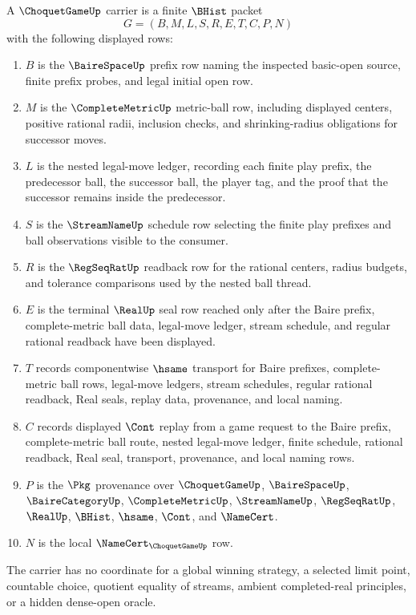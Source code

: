 \begin{definition}
\label{def:choquet-game-carrier}
A $\ChoquetGameUp$ carrier is a finite $\BHist$ packet
$$
G=(B,M,L,S,R,E,T,C,P,N)
$$
with the following displayed rows:
\begin{enumerate}
\item $B$ is the $\BaireSpaceUp$ prefix row naming the inspected basic-open source, finite prefix probes, and legal initial open row.
\item $M$ is the $\CompleteMetricUp$ metric-ball row, including displayed centers, positive rational radii, inclusion checks, and shrinking-radius obligations for successor moves.
\item $L$ is the nested legal-move ledger, recording each finite play prefix, the predecessor ball, the successor ball, the player tag, and the proof that the successor remains inside the predecessor.
\item $S$ is the $\StreamNameUp$ schedule row selecting the finite play prefixes and ball observations visible to the consumer.
\item $R$ is the $\RegSeqRatUp$ readback row for the rational centers, radius budgets, and tolerance comparisons used by the nested ball thread.
\item $E$ is the terminal $\RealUp$ seal row reached only after the Baire prefix, complete-metric ball data, legal-move ledger, stream schedule, and regular rational readback have been displayed.
\item $T$ records componentwise $\hsame$ transport for Baire prefixes, complete-metric ball rows, legal-move ledgers, stream schedules, regular rational readback, Real seals, replay data, provenance, and local naming.
\item $C$ records displayed $\Cont$ replay from a game request to the Baire prefix, complete-metric ball route, nested legal-move ledger, finite schedule, rational readback, Real seal, transport, provenance, and local naming rows.
\item $P$ is the $\Pkg$ provenance over $\ChoquetGameUp$, $\BaireSpaceUp$, $\BaireCategoryUp$, $\CompleteMetricUp$, $\StreamNameUp$, $\RegSeqRatUp$, $\RealUp$, $\BHist$, $\hsame$, $\Cont$, and $\NameCert$.
\item $N$ is the local $\NameCert_{\ChoquetGameUp}$ row.
\end{enumerate}
The carrier has no coordinate for a global winning strategy, a selected limit point, countable choice, quotient equality of streams, ambient completed-real principles, or a hidden dense-open oracle.
\end{definition}

